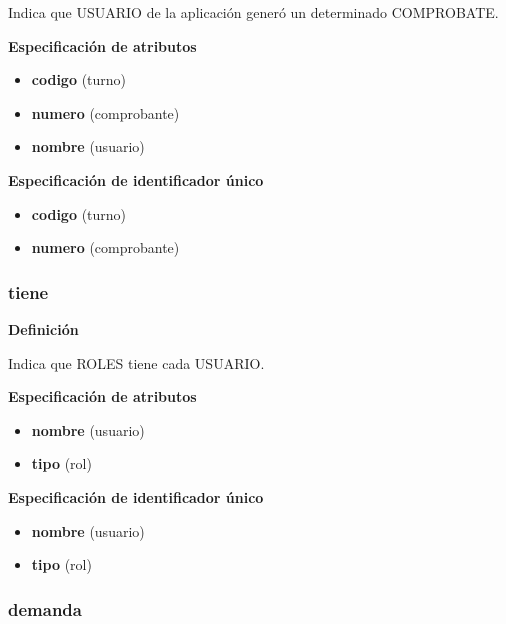 \documentclass[a4paper,11pt]{article}
\begin{document}
Indica que USUARIO de la aplicación generó un determinado COMPROBATE.

\textbf{Especificación de atributos}


\begin{itemize}
     \item \textbf{codigo} (turno)

     \item \textbf{numero} (comprobante)

     \item \textbf{nombre} (usuario)


\end{itemize}

\textbf{Especificación de identificador único}

\begin{itemize}

     \item \textbf{codigo} (turno)

     \item \textbf{numero} (comprobante)


\end{itemize}

\subsubsection{\textbf{tiene}}

\textbf{Definición}

Indica que ROLES tiene cada USUARIO.

\textbf{Especificación de atributos}


\begin{itemize}

     \item \textbf{nombre} (usuario)

     \item \textbf{tipo} (rol)

\end{itemize}

\textbf{Especificación de identificador único}

\begin{itemize}

     \item \textbf{nombre} (usuario)

     \item \textbf{tipo} (rol)

\end{itemize}

\subsubsection{\textbf{demanda}}
\end{document}
